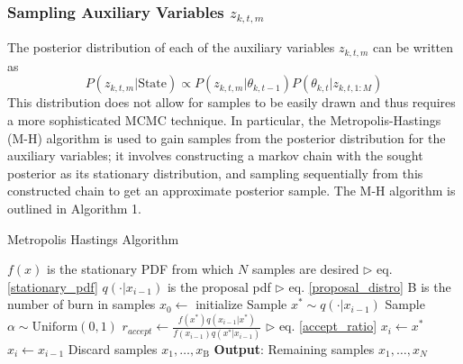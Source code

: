 \documentclass[smallcondensed, final]{svjour3}
\newcommand{\willie}[1]{\textcolor{green}{\textsf{\emph{\textbf{\textcolor{green}{#1}}}}}}
\begin{document}

\subsubsection{Sampling Auxiliary Variables $z_{k,t,m}$}
The posterior distribution of each of the auxiliary variables $z_{k,t,m}$ can be written as
\begin{equation}
\label{stationary_pdf}
P(z_{k,t,m} | \text{State}) \propto  P(z_{k,t,m} | \theta_{k,t-1}) P(\theta_{k,t} | z_{k,t,1:M})
\end{equation}
This distribution does not allow for samples to be easily drawn and thus requires a more sophisticated MCMC technique. In particular, the Metropolis-Hastings (M-H) algorithm is used to gain samples from the posterior distribution for the auxiliary variables; it involves constructing a markov chain with the sought posterior as its stationary distribution, and sampling sequentially from this constructed chain to get an approximate posterior sample. The M-H algorithm is outlined in Algorithm 1.%

\begin{algorithm}[h!]
\label{alg:MH}
\caption{Metropolis Hastings Algorithm}
\begin{algorithmic}[1]
\STATE $f(x)$ is the stationary PDF from which $N$ samples are desired \hfill $\triangleright$ eq. \eqref{stationary_pdf}
\STATE $q( \cdot | x_{i-1})$ is the proposal pdf \hfill $\triangleright$ eq. \eqref{proposal_distro}
\STATE B is the number of burn in samples
\STATE $x_{0} \leftarrow$ initialize
\STATE Sample $x^{*} \sim q( \cdot | x_{i-1})$
\STATE Sample $\alpha \sim \text{Uniform}(0,1)$
\STATE $r_{accept} \leftarrow \frac{f(x^{*})q(x_{i-1} | x^{*})} {f(x_{i-1})q(x^{*} | x_{i-1})} $ \hfill $\triangleright$  eq. \eqref{accept_ratio}
\STATE $x_{i} \leftarrow x^{*}$
\ELSE
\STATE $x_{i} \leftarrow x_{i-1}$
\ENDIF
\ENDFOR
\STATE Discard samples $x_{1}, \ldots, x_{\text{B}}$
\STATE \textbf{Output}: Remaining samples $x_{1}, \ldots, x_{N}$
\end{algorithmic}
\end{algorithm}
\end{document}

